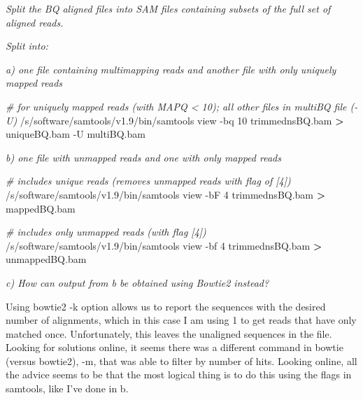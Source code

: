 \documentclass[]{article}
\newenvironment{Shaded}{\begin{snugshade}}{\end{snugshade}}
\newcommand{\CommentTok}[1]{\textcolor[rgb]{0.56,0.35,0.01}{\textit{#1}}}
\newcommand{\VariableTok}[1]{\textcolor[rgb]{0.00,0.00,0.00}{#1}}
\newcommand{\OperatorTok}[1]{\textcolor[rgb]{0.81,0.36,0.00}{\textbf{#1}}}
\newcommand{\BuiltInTok}[1]{#1}
\newcommand{\ExtensionTok}[1]{#1}
\newcommand{\NormalTok}[1]{#1}
\begin{document}
\emph{Split the BQ aligned files into SAM files containing subsets of
the full set of aligned reads.}

\emph{Split into:}

\emph{a) one file containing multimapping reads and another file with
only uniquely mapped reads}

\begin{Shaded}
\begin{Highlighting}[]
\CommentTok{# for uniquely mapped reads (with MAPQ < 10); all other files in multiBQ file (-U)}
\ExtensionTok{/s/software/samtools/v1.9/bin/samtools}\NormalTok{ view -bq 10 trimmednsBQ.bam }\OperatorTok{>}\NormalTok{ uniqueBQ.bam -U multiBQ.bam}
\end{Highlighting}
\end{Shaded}

\emph{b) one file with unmapped reads and one with only mapped reads}

\begin{Shaded}
\begin{Highlighting}[]
\CommentTok{# includes unique reads (removes unmapped reads with flag of [4])}
\ExtensionTok{/s/software/samtools/v1.9/bin/samtools}\NormalTok{ view -bF 4 trimmednsBQ.bam }\OperatorTok{>}\NormalTok{ mappedBQ.bam}

\CommentTok{# includes only unmapped reads (with flag [4])}
\ExtensionTok{/s/software/samtools/v1.9/bin/samtools}\NormalTok{ view -bf 4 trimmednsBQ.bam }\OperatorTok{>}\NormalTok{ unmappedBQ.bam}
\end{Highlighting}
\end{Shaded}

\emph{c) How can output from b be obtained using Bowtie2 instead?}

Using bowtie2 -k option allows us to report the sequences with the
desired number of alignments, which in this case I am using 1 to get
reads that have only matched once. Unfortunately, this leaves the
unaligned sequences in the file. Looking for solutions online, it seems
there was a different command in bowtie (versus bowtie2), -m, that was
able to filter by number of hits. Looking online, all the advice seems
to be that the most logical thing is to do this using the flags in
samtools, like I've done in b.

\begin{Shaded}
\end{Shaded}
\end{document}
